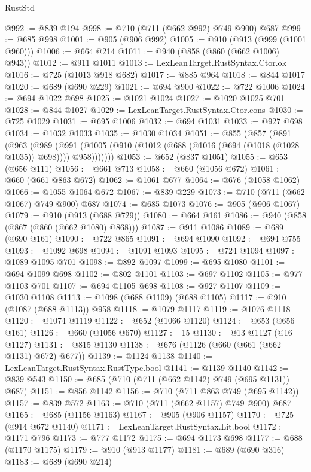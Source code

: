 \begin{lexlean}{RustStd}
\begin{coremodule}
@992 := @839 @194
@998 := @710 (@711 (@662 @992) @749 @900) @687
@999 := @685 @998
@1001 := @905 (@906 @992)
@1005 := @910 (@913 (@999 (@1001 @960)))
@1006 := @664 @214
@1011 := @940 (@858 (@860 (@662 @1006) @943))
@1012 := @911 @1011
@1013 := LexLeanTarget.RustSyntax.Ctor.ok
@1016 := @725 (@1013 @918 @682)
@1017 := @885 @964
@1018 := @844 @1017
@1020 := @689 (@690 @229)
@1021 := @694 @900
@1022 := @722 @1006
@1024 := @694 @1022 @698
@1025 := @1021 @1024
@1027 := @1020 @1025 @701
@1028 := @844 @1027
@1029 := LexLeanTarget.RustSyntax.Ctor.cons
@1030 := @725 @1029
@1031 := @695 @1006
@1032 := @694 @1031
@1033 := @927 @698
@1034 := @1032 @1033
@1035 := @1030 @1034
@1051 := @855
    (@857
      (@891
        (@963
          (@989
            (@991 (@1005 (@910 (@1012 (@688 (@1016 (@694 (@1018 (@1028 @1035)) @698)))) @958)))))))
@1053 := @652 (@837 @1051)
@1055 := @653 (@656 @111)
@1056 := @661 @713
@1058 := @660 (@1056 @672)
@1061 := @660 (@661 @863 @672)
@1062 := @1061 @677
@1064 := @676 (@1058 @1062)
@1066 := @1055 @1064 @672
@1067 := @839 @229
@1073 := @710 (@711 (@662 @1067) @749 @900) @687
@1074 := @685 @1073
@1076 := @905 (@906 @1067)
@1079 := @910 (@913 (@688 @729))
@1080 := @664 @161
@1086 := @940 (@858 (@867 (@860 (@662 @1080) @868)))
@1087 := @911 @1086
@1089 := @689 (@690 @161)
@1090 := @722 @865
@1091 := @694 @1090
@1092 := @694 @755
@1093 := @1092 @698
@1094 := @1091 @1093
@1095 := @724 @1094
@1097 := @1089 @1095 @701
@1098 := @892 @1097
@1099 := @695 @1080
@1101 := @694 @1099 @698
@1102 := @802 @1101
@1103 := @697 @1102
@1105 := @977 @1103 @701
@1107 := @694 @1105 @698
@1108 := @927 @1107
@1109 := @1030 @1108
@1113 := @1098 (@688 @1109) (@688 @1105)
@1117 := @910 (@1087 (@688 @1113)) @958
@1118 := @1079 @1117
@1119 := @1076 @1118
@1120 := @1074 @1119
@1122 := @652 (@1066 @1120)
@1124 := @653 (@656 @161)
@1126 := @660 (@1056 @670)
@1127 := 15
@1130 := @13 @1127 (@16 @1127)
@1131 := @815 @1130
@1138 := @676 (@1126 (@660 (@661 (@662 @1131) @672) @677))
@1139 := @1124 @1138
@1140 := LexLeanTarget.RustSyntax.RustType.bool
@1141 := @1139 @1140
@1142 := @839 @543
@1150 := @685 (@710 (@711 (@662 @1142) @749 (@695 @1131)) @687)
@1151 := @856 @1142
@1156 := @710 (@711 @863 @749 (@695 @1142))
@1157 := @839 @572
@1163 := @710 (@711 (@662 @1157) @749 @900) @687
@1165 := @685 (@1156 @1163)
@1167 := @905 (@906 @1157)
@1170 := @725 (@914 @672 @1140)
@1171 := LexLeanTarget.RustSyntax.Lit.bool
@1172 := @1171 @796
@1173 := @777 @1172
@1175 := @694 @1173 @698
@1177 := @688 (@1170 @1175)
@1179 := @910 (@913 @1177)
@1181 := @689 (@690 @316)
@1183 := @689 (@690 @214)

\end{coremodule}
\end{lexlean}
